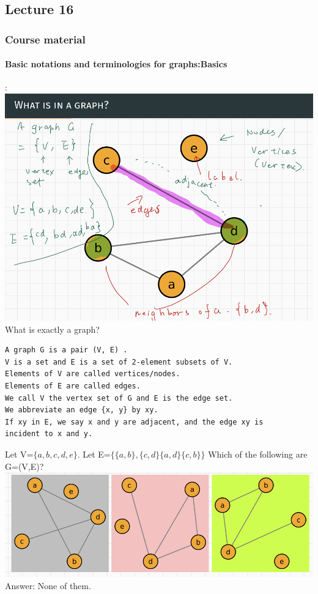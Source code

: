\documentclass{article}
\begin{document}
\subsection{Lecture 16}
\subsubsection{Course material}
\paragraph{Basic notations and terminologies for graphs:Basics}:\newline
\includegraphics{0034}\newline
What is exactly a graph?\newline
\begin{lstlisting}
A graph G is a pair (V, E) .
V is a set and E is a set of 2-element subsets of V.
Elements of V are called vertices/nodes.
Elements of E are called edges.
We call V the vertex set of G and E is the edge set.
We abbreviate an edge {x, y} by xy.
If xy in E, we say x and y are adjacent, and the edge xy is
incident to x and y.
\end{lstlisting}
Let V=$\{a,b,c,d,e\}$. Let E=$\{\{a,b\},\{c,d\}\{a,d\}\{c,b\}\}$\newline
Which of the following are G=(V,E)?\newline
\includegraphics{0024}\newline
Answer: None of them.
\end{document}
